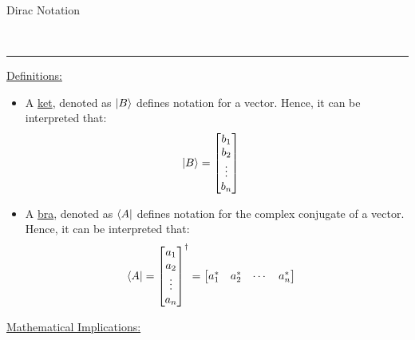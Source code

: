 \documentclass{article}
\newcommand{\header}[1]{\begin{large}\noindent #1\end{large}\\\rule{\textwidth}{0.5pt}}
\newcommand{\sheader}[1]{\underline{#1:}}
\begin{document}
    \pagebreak

    \header{Dirac Notation}

    \sheader{Definitions}
    \begin{itemize}
        \item A \underline{ket}, denoted as $\ket{B}$ defines notation for a vector. Hence, it 
        can be interpreted that:
        \begin{align*}
            \ket{B} &= \begin{bmatrix}
                b_1 \\
                b_2 \\
                \vdots \\
                b_n
            \end{bmatrix}
        \end{align*}
        \item A \underline{bra}, denoted as $\bra{A}$ defines notation for the complex conjugate 
        of a vector. Hence, it can be interpreted that:
        \begin{align*}
            \bra{A} &= \begin{bmatrix}
                a_1 \\
                a_2 \\
                \vdots \\
                a_n
            \end{bmatrix}^\dagger = 
            \begin{bmatrix}
                a_1^* & a_2^* & \cdots & a_n^*
            \end{bmatrix}
        \end{align*}
    \end{itemize}
    \sheader{Mathematical Implications}
\end{document}
